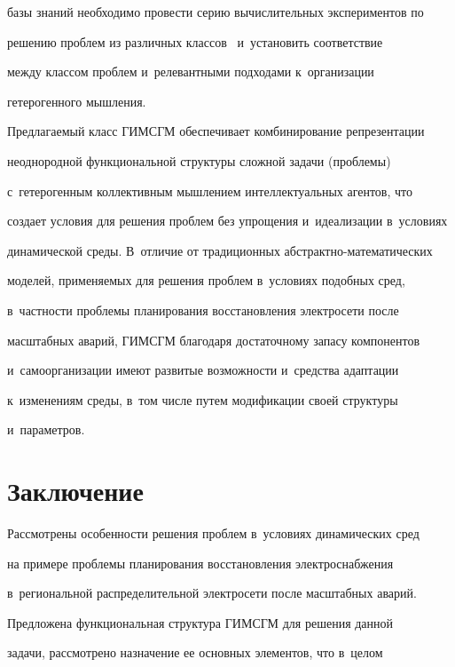 базы знаний необходимо про\-вес\-ти серию вычислительных экспериментов по 


решению проб\-лем из различных классов~\cite{5-kl} и~установить соответствие 


между классом проблем и~релевантными подходами к~организации 


гетерогенного мышления.


  


  Предлагаемый класс ГИМСГМ обеспечивает комбинирование репрезентации 


неоднородной функциональной структуры сложной задачи (проблемы) 


с~гетерогенным коллективным мышлением интеллектуальных агентов, что 


создает условия для решения проблем без упрощения и~идеализации в~условиях 


динамической среды. В~отличие от традиционных абстрактно-математических 


моделей, применяемых для решения проблем в~условиях подобных сред, 


в~частности проблемы планирования восстановления электросети после 


масштабных аварий, ГИМСГМ благодаря достаточному запасу компонентов 


и~самоорганизации имеют развитые возможности и~средства адаптации 


к~изменениям среды, в~том числе путем модификации своей структуры 


и~параметров.


  


\section{Заключение}





  Рассмотрены особенности решения проблем в~условиях динамических сред 


на примере проблемы планирования восстановления электроснабжения 


в~региональной распределительной электросети после масштабных аварий.  


Предложена функциональная структура \mbox{ГИМСГМ} для решения данной 


задачи, рассмотрено назначение ее основных элементов, что в~целом 


